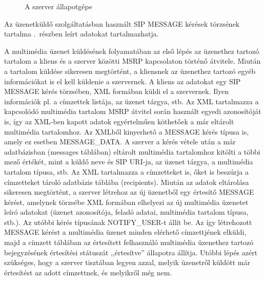 \begin{figure}[htbp]
\center
{}
\caption{A szerver állapotgépe}
\label{fig:server_statemachine_message}
\end{figure}

Az üzenetküldő szolgáltatásban használt SIP MESSAGE kérések törzsének tartalma .~részben leírt adatokat tartalmazhatja.

A multimédia üzenet küldésének folyamatában az első lépés az üzenethez tartozó tartalom a kliens és a szerver közötti MSRP kapcsolaton történő átvitele. Miután a tartalom küldése sikeresen megtörtént, a kliensnek az üzenethez tartozó egyéb információkat is el kell küldenie a szervernek. A kliens az adatokat egy SIP MESSAGE kérés törzsében, XML formában küldi el a szervernek. Ilyen információk pl. a címzettek listája, az üzenet tárgya, stb. Az XML tartalmazza a kapcsolódó multimédia tartalom MSRP átvitel során használt egyedi azonosítóját is, így az XML-ben kapott adatok egyértelműen köthetőek a már eltárolt multimédia tartalomhoz.  Az XMLből kinyerhető a MESSAGE kérés típusa is, amely ez esetben MESSAGE\_DATA. A szerver a kérés vétele után a már adatbázisban (messages táblában) eltárolt multimédia tartalomhoz kitölti a többi mező értékét, mint a küldő neve és SIP URI-ja, az üzenet tárgya, a multimédia tartalom típusa, stb. Az XML tartalmazza a címzetteket is, őket is beszúrja a címzetteket tároló adatbázis táblába (recipients). Miután az adatok eltárolása sikeresen megtörtént, a szerver létrehoz az új üzenetből egy értesítő MESSAGE kérést, amelynek törzsébe XML formában elhelyezi az új multimédia üzenetet leíró adatokat (üzenet azonosítója, feladó adatai, multimédia tartalom típusa, stb.). Az utóbbi kérés típusának NOTIFY\_USER-t állít be. Az így létrehozott MESSAGE kérést a multimédia üzenet minden elérhető címzettjének elküldi, majd a címzett táblában az értesített felhasználó multimédia üzenethez tartozó bejegyzésének értesítési státuszát ,,értesítve'' állapotra állítja. Utóbbi lépés azért szükséges, hogy a szerver tisztában legyen azzal, melyik üzenetről küldött már értesítést az adott címzettnek, és melyikről még nem.

